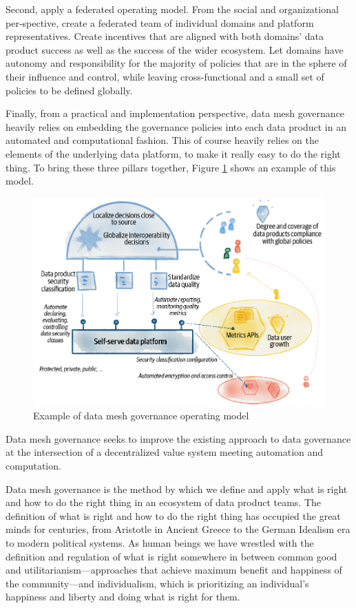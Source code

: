 \documentclass[12pt, a4paper]{book}
\begin{document}
Second, apply a federated operating model. From the social and organizational per‐spective, create a federated team of individual domains and platform representatives. Create incentives that are aligned with both domains’ data product success as well as the success of the wider ecosystem. Let domains have autonomy and responsibility for the majority of policies that are in the sphere of their influence and control, while leaving cross-functional and a small set of policies to be defined globally.

Finally, from a practical and implementation perspective, data mesh governance heavily relies on embedding the governance policies into each data product in an automated and computational fashion. This of course heavily relies on the elements of the underlying data platform, to make it really easy to do the right thing. To bring these three pillars together, Figure \ref{DataGov} shows an example of this model.

\begin{figure}[h]
	\centering
	\includegraphics[width=12cm]{DataGov.png}
	\caption{Example of data mesh governance operating model}
	\label{DataGov}
\end{figure}

Data mesh governance seeks to improve the existing approach to data governance at the intersection of a decentralized value system meeting automation and computation.

Data mesh governance is the method by which we define and apply what is right and how to do the right thing in an ecosystem of data product teams. The definition of what is right and how to do the right thing has occupied the great minds for centuries, from Aristotle in Ancient Greece to the German Idealism era to modern political systems. As human beings we have wrestled with the definition and regulation of what is right somewhere in between common good and utilitarianism—approaches that achieve maximum benefit and happiness of the community—and individualism, which is prioritizing an individual’s happiness and liberty and doing what is right for them.
\end{document}
